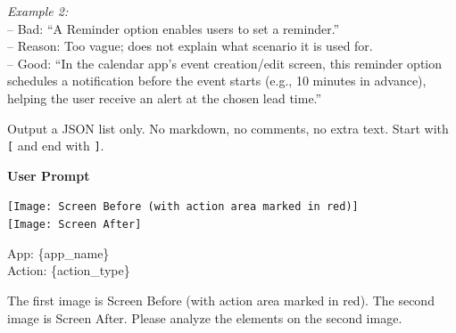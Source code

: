 \documentclass{article} %
\begin{document}
\begin{tcolorbox}[title=Prompt for Functionality Extraction, colback=gray!5, colframe=gray!50, fonttitle=\bfseries\small, fontupper=\small, fontlower=\small, breakable]
\textit{Example 2:}\\
-- Bad: ``A Reminder option enables users to set a reminder.''\\
-- Reason: Too vague; does not explain what scenario it is used for.\\
-- Good: ``In the calendar app's event creation/edit screen, this reminder option schedules a notification before the event starts (e.g., 10 minutes in advance), helping the user receive an alert at the chosen lead time.''

Output a JSON list only. No markdown, no comments, no extra text. Start with \texttt{[} and end with \texttt{]}.

\tcblower

\textbf{User Prompt}
\vspace{0.3em}

\texttt{[Image: Screen Before (with action area marked in red)]}\\
\texttt{[Image: Screen After]}

App: \{app\_name\}\\
Action: \{action\_type\}

The first image is Screen Before (with action area marked in red). The second image is Screen After. Please analyze the elements on the second image.

\end{tcolorbox}
\end{document}
